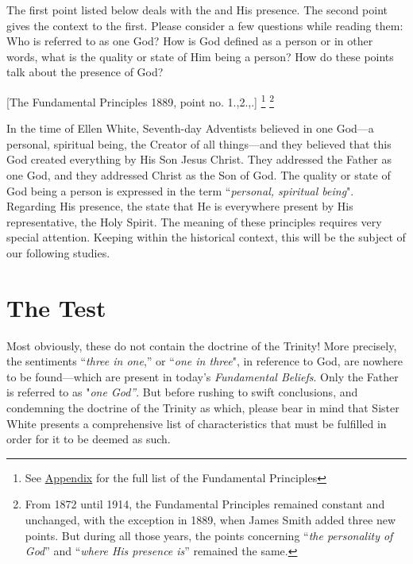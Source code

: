 The first point listed below deals with the  and His presence. The second point gives the context to the first. Please consider a few questions while reading them: Who is referred to as one God? How is God defined as a person or in other words, what is the quality or state of Him being a person? How do these points talk about the presence of God?


[The Fundamental Principles 1889, point no. 1.,2.,.] \footnote{See \hyperref[chap:appendix]{Appendix} for the full list of the Fundamental Principles} \footnote{From 1872 until 1914, the Fundamental Principles remained constant and unchanged, with the exception in 1889, when James Smith added three new points. But during all those years, the points concerning “\textit{the personality of God}” and “\textit{where His presence is}” remained the same. }

In the time of Ellen White, Seventh-day Adventists believed in one God—a personal, spiritual being, the Creator of all things—and they believed that this God created everything by His Son Jesus Christ. They addressed the Father as one God, and they addressed Christ as the Son of God. The quality or state of God being a person is expressed in the term “\textit{personal, spiritual being}". Regarding His presence, the  state that He is everywhere present by His representative, the Holy Spirit. The meaning of these principles requires very special attention. Keeping within the historical context, this will be the subject of our following studies.  

\section*{The Test}

Most obviously, these  do not contain the doctrine of the Trinity! More precisely, the sentiments “\textit{three in one},” or “\textit{one in three}", in reference to God, are nowhere to be found—which are present in today’s \textit{Fundamental Beliefs}. Only the Father is referred to as "\textit{one God''}. But before rushing to swift conclusions, and condemning the doctrine of the Trinity as which, please bear in mind that Sister White presents a comprehensive list of characteristics that must be fulfilled in order for it to be deemed as such.

